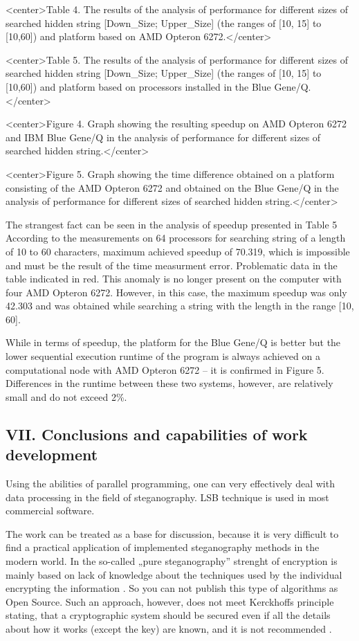 \documentclass[10pt, a5paper]{article}
\begin{document}
<center>Table 4. The results of the analysis of performance for different sizes of searched hidden string [Down\_Size; Upper\_Size] (the ranges of [10, 15] to [10,60]) and platform based on AMD Opteron 6272.</center>


<center>Table 5. The results of the analysis of performance for different sizes of searched hidden string [Down\_Size; Upper\_Size] (the ranges of [10, 15] to [10,60]) and platform based on processors installed in the Blue Gene/Q.</center>


<center>Figure 4. Graph showing the resulting speedup on AMD Opteron 6272 and IBM Blue Gene/Q in the analysis of performance for different sizes of searched hidden string.</center>


<center>Figure 5. Graph showing the time difference obtained on a platform consisting of the AMD Opteron 6272 and obtained on the Blue Gene/Q in the analysis of performance for different sizes of searched hidden string.</center>

The strangest fact can be seen in the analysis of speedup presented in Table 5 According to the measurements on 64 processors for searching string of a length of 10 to 60 characters, maximum achieved speedup of 70.319, which is impossible and must be the result of the time measurment error. Problematic data in the table indicated in red. This anomaly is no longer present on the computer with four AMD Opteron 6272. However, in this case, the maximum speedup was only 42.303 and was obtained while searching a string with the length in the range [10, 60].

While in terms of speedup, the platform for the Blue Gene/Q is better but the lower sequential execution runtime of the program is always achieved on a computational node with AMD Opteron 6272 -- it is confirmed in Figure 5. Differences in the runtime between these two systems, however, are relatively small and do not exceed 2\%.

\subsection*{VII. Conclusions and capabilities of work development}

Using the abilities of parallel programming, one  can very effectively deal with data processing in the field of steganography. LSB technique is used in most commercial software.

The work can be treated as a base for discussion, because it is very difficult to find a practical application of implemented steganography methods in the modern world. In the so-called „pure steganography” strenght of encryption is mainly based on lack of knowledge about the techniques used by the individual encrypting the information \footnotemark[7]. So you can not publish this type of algorithms as Open Source. Such an approach, however, does not meet Kerckhoffs principle \footnotemark[10] stating, that a cryptographic system should be secured even if all the details about how it works (except the key) are known, and it is not recommended .
\end{document}
